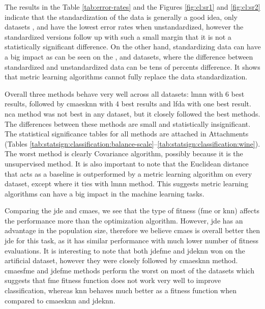 \documentclass[12pt,a4paper]{report}
\begin{document}
The results in the Table \ref{tab:error-rates} and the Figures \ref{fig:cl:sr1} and \ref{fig:cl:sr2} indicate that the standardization of the data is generally a good idea, only datasets ,  and  have the lowest error rates when unstandardized, however the standardized versions follow up with such a small margin that it is not a statistically significant difference. On the other hand, standardizing data can have a big impact as can be seen on the ,  and  datasets, where the difference between standardized and unstandardized data can be tens of percents difference. It shows that metric learning algorithms cannot fully replace the data standardization.

Overall three methods behave very well across all datasets: \ac{lmnn} with 6 best results, followed by \ac{cmaesknn} with 4 best results and \ac{lfda} with one best result. \ac{nca} method was not best in any dataset, but it closely followed the best methods. The differences between these methods are small and statistically insignificant. The statistical significance tables for all methods are attached in Attachments (Tables \ref{tab:statsign:classification:balance-scale}--\ref{tab:statsign:classification:wine}). The worst method is clearly Covariance algorithm, possibly because it is the unsupervised method. It is also important to note that the Euclidean distance that acts as a baseline is outperformed by a metric learning algorithm on every dataset, except  where it ties with \ac{lmnn} method. This suggests metric learning algorithms can have a big impact in the machine learning tasks.

Comparing the \ac{jde} and \ac{cmaes}, we see that the type of fitness (\ac{fme} or \ac{knn}) affects the performance more than the optimization algorithm. However, \ac{jde} has an advantage in the population size, therefore we believe \ac{cmaes} is overall better then \ac{jde} for this task, as it has similar performance with much lower number of fitness evaluations. It is interesting to note that both \ac{jdefme} and \ac{jdeknn} won on the artificial  dataset, however they were closely followed by \ac{cmaesknn} method. \ac{cmaesfme} and \ac{jdefme} methods perform the worst on most of the datasets which suggests that \ac{fme} fitness function does not work very well to improve classification, whereas \ac{knn} behaves much better as a fitness function when compared to \ac{cmaesknn} and \ac{jdeknn}.
\end{document}
